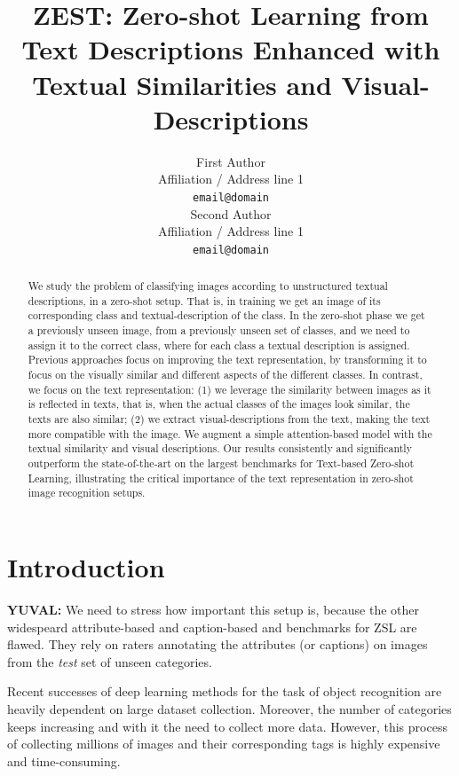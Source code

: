 \documentclass[11pt,a4paper]{article}
\title{ZEST:  Zero-shot Learning from Text Descriptions Enhanced with Textual Similarities and Visual-Descriptions}
\author{First Author \\
  Affiliation / Address line 1 \\
  \texttt{email@domain} \\\And
  Second Author \\
  Affiliation / Address line 1 \\
  \texttt{email@domain} \\}
\date{}
\newcommand\yuval[1]{\textcolor{darkpink}{\textbf{YUVAL:} #1 }}
\begin{document}
\maketitle
\begin{abstract}








We study the problem of classifying images according to unstructured textual descriptions, in a zero-shot setup. That is, in training we get an image of its corresponding class and textual-description of the class. In the zero-shot phase we get a previously unseen image, from a previously unseen set of classes, and we need to assign it to the correct class, where for each class a textual description is assigned.
Previous approaches focus on improving the text representation, by transforming it to focus on the visually similar and different aspects of the different classes. In contrast, we focus on the text representation: (1) we leverage the similarity between images as it is reflected in texts, that is, when the actual classes of the images look similar, the texts are also similar; (2) we extract visual-descriptions from the text, making the text more compatible with the image.
We augment a simple attention-based model with the textual similarity and visual descriptions. 
Our results consistently and significantly outperform the state-of-the-art on the largest benchmarks for Text-based Zero-shot Learning, illustrating the critical importance of the text representation in zero-shot image recognition setups. 

\end{abstract}




\section{Introduction}

\yuval{We need to stress how important this setup is, because the other widespeard attribute-based and caption-based and benchmarks for ZSL are flawed. They rely on raters annotating the attributes (or captions) on images from the \textit{test} set of unseen categories.}

Recent successes of deep learning methods for the task of object recognition are heavily dependent on large dataset collection.
Moreover, the number of categories keeps increasing and with it the need to collect more data. However, this process of collecting millions of images and their corresponding tags is highly expensive and time-consuming. \par
\end{document}
